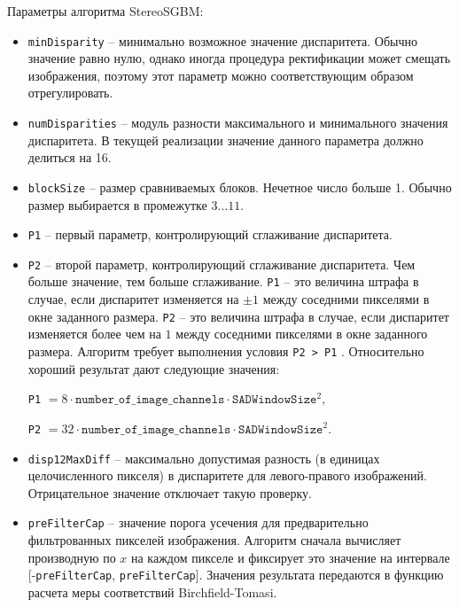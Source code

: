 \documentclass[oneside,final,12pt]{scrartcl}
\begin{document}
		 	Параметры алгоритма StereoSGBM:
		 	\begin{itemize}
		 		\item \texttt{minDisparity}	-- минимально возможное значение диспаритета. Обычно значение равно нулю, однако иногда процедура ректификации может смещать изображения, поэтому этот параметр можно соответствующим образом отрегулировать.

			 	\item \texttt{numDisparities} -- модуль разности максимального и минимального значения диспаритета. В текущей реализации значение данного параметра должно делиться на 16.

			 	\item \texttt{blockSize} -- размер сравниваемых блоков. Нечетное число больше 1. Обычно размер выбирается в промежутке \(3 \dots 11\).

			 	\item \texttt{P1} -- первый параметр, контролирующий сглаживание диспаритета.

			 	\item \texttt{P2} -- второй параметр, контролирующий сглаживание диспаритета. Чем больше значение, тем больше сглаживание. \texttt{P1} -- это величина штрафа в случае, если диспаритет изменяется на \(\pm 1\) между соседними пикселями в окне заданного размера. \texttt{P2} -- это величина штрафа в случае, если диспаритет изменяется более чем на \(1\) между соседними пикселями в окне заданного размера.
			 	Алгоритм требует выполнения условия \texttt{P2 > P1} . Относительно хороший результат дают следующие значения:

			 	\begin{center}
			 		\texttt{P1} \(=8 \cdot \texttt{number\_of\_image\_channels} \cdot \texttt{SADWindowSize}^{2},\)

			 		\texttt{P2} \(=32  \cdot \texttt{number\_of\_image\_channels} \cdot \texttt{SADWindowSize}^{2}.\)
			 	\end{center}

			 	\item \texttt{disp12MaxDiff} -- максимально допустимая разность (в единицах целочисленного пикселя) в диспаритете для левого-правого изображений. Отрицательное значение отключает такую проверку.

			 	\item \texttt{preFilterCap} -- значение порога усечения для предварительно фильтрованных пикселей изображения. Алгоритм сначала вычисляет производную по \(x\) на каждом пикселе и фиксирует это значение на интервале [-\texttt{preFilterCap}, \texttt{preFilterCap}]. Значения результата передаются в функцию расчета меры соответствий Birchfield-Tomasi.


\end{itemize}
\end{document}

